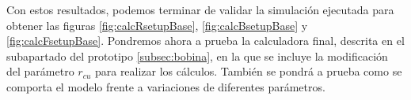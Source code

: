 Con estos resultados, podemos terminar de validar la simulación ejecutada para obtener las figuras \ref{fig:calcRsetupBase}, \ref{fig:calcBsetupBase} y \ref{fig:calcFsetupBase}. Pondremos ahora a prueba la calculadora final, descrita en el subapartado del prototipo \ref{subsec:bobina}, en la que se incluye la modificación del parámetro \(r_{cu}\) para realizar los cálculos. También se pondrá a prueba como se comporta el modelo frente a variaciones de diferentes parámetros.